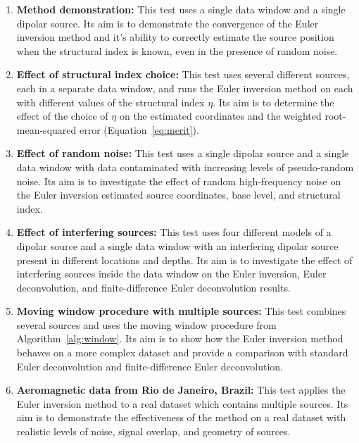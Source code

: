 \begin{enumerate}
    \item \textbf{Method demonstration:} This test uses a single data window
        and a single dipolar source. Its aim is to demonstrate the convergence
        of the Euler inversion method and it's ability to correctly estimate
        the source position when the structural index is known, even in the
        presence of random noise.
    \item \textbf{Effect of structural index choice:} This test uses several
        different sources, each in a separate data window, and runs the Euler
        inversion method on each with different values of the structural index
        $\eta$. Its aim is to determine the effect of the choice of $\eta$ on
        the estimated coordinates and the weighted root-mean-squared error
        (Equation~\ref{eq:merit}).
    \item \textbf{Effect of random noise:} This test uses a single dipolar
        source and a single data window with data contaminated with increasing
        levels of pseudo-random noise. Its aim is to investigate the effect of
        random high-frequency noise on the Euler inversion estimated source
        coordinates, base level, and structural index.
    \item \textbf{Effect of interfering sources:} This test uses four different
        models of a dipolar source and a single data window with an interfering
        dipolar source present in different locations and depths. Its aim is to
        investigate the effect of interfering sources inside the data window on
        the Euler inversion, Euler deconvolution, and finite-difference Euler
        deconvolution results.
    \item \textbf{Moving window procedure with multiple sources:} This test
        combines several sources and uses the moving window procedure from
        Algorithm~\ref{alg:window}. Its aim is to show how the Euler inversion
        method behaves on a more complex dataset and provide a comparison with
        standard Euler deconvolution and finite-difference Euler deconvolution.
    \item \textbf{Aeromagnetic data from Rio de Janeiro, Brazil:} This test applies
        the Euler inversion method to a real dataset which contains multiple
        sources. Its aim is to demonstrate the effectiveness of the method
        on a real dataset with realistic levels of noise, signal overlap,
        and geometry of sources.
\end{enumerate}

